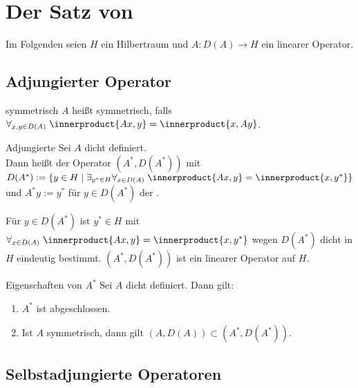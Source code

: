 \chapter{%
    Der Satz von %
}

\begin{Bem}
    Im Folgenden seien $H$ ein Hilbertraum und $A\colon D(A) \to H$ ein linearer Operator.
\end{Bem}

\section{%
    Adjungierter Operator%
}

\begin{Def}{symmetrisch}
    $A$ heißt symmetrisch, falls $\forall_{x, y \in D(A)}\; \innerproduct{Ax, y} = \innerproduct{x, Ay}$.
\end{Def}

\begin{Def}{Adjungierte}
    Sei $A$ dicht definiert.\\
    Dann heißt der Operator $(A^\ast, D(A^\ast))$ mit
    $D(A^\ast) := \{y \in H \;|\; \exists_{y^\ast \in H} \forall_{x \in D(A)}\;
    \innerproduct{Ax, y} = \innerproduct{x, y^\ast}\}$ und $A^\ast y := y^\ast$ für $y \in D(A^\ast)$
    der .
\end{Def}

\begin{Bem}
    Für $y \in D(A^\ast)$ ist $y^\ast \in H$ mit
    $\forall_{x \in D(A)}\; \innerproduct{Ax, y} = \innerproduct{x, y^\ast}$
    wegen $D(A^\ast)$ dicht in $H$ eindeutig bestimmt.
    $(A^\ast, D(A^\ast))$ ist ein linearer Operator auf $H$.
\end{Bem}

\linie

\begin{Lemma}{Eigenschaften von $A^\ast$}
    Sei $A$ dicht definiert.
    Dann gilt:
    \begin{enumerate}
        \item
        $A^\ast$ ist abgeschlossen.

        \item
        Ist $A$ symmetrisch, dann gilt $(A, D(A)) \subset (A^\ast, D(A^\ast))$.
    \end{enumerate}
\end{Lemma}

\section{%
    Selbstadjungierte Operatoren%
}

